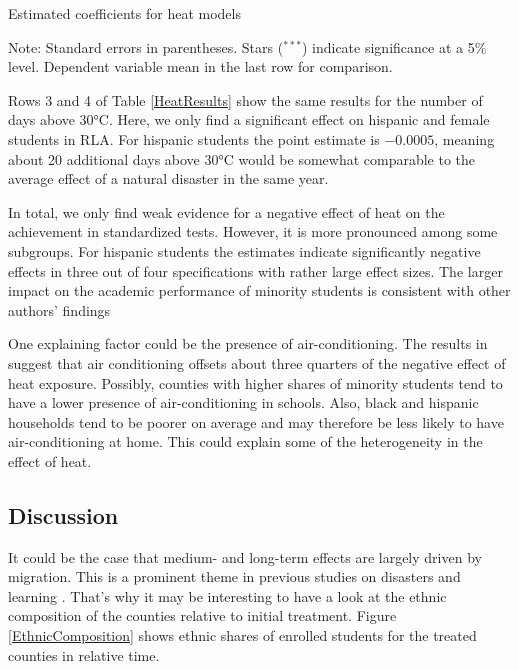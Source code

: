 \begin{table}
	\small
	\caption{Estimated coefficients for heat models}
	\label{HeatResults}
	
	{\raggedright Note: Standard errors in parentheses. Stars ($^{***}$) indicate significance at a 5\% level. Dependent variable mean in the last row for comparison. \par}
\end{table}

Rows 3 and 4 of Table \ref{HeatResults} show the same results for the number of days above 30°C. Here, we only find a significant effect on hispanic and female students in RLA. For hispanic students the point estimate is $-0.0005$, meaning about 20 additional days above 30°C would be somewhat comparable to the average effect of a natural disaster in the same year.

In total, we only find weak evidence for a negative effect of heat on the achievement in standardized tests. However, it is more pronounced among some subgroups. For hispanic students the estimates indicate significantly negative effects in three out of four specifications with rather large effect sizes. The larger impact on the academic performance of minority students is consistent with other authors' findings \citep[for example][]{Goodman_2020}

One explaining factor could be the presence of air-conditioning. The results in \cite{Goodman_2020} suggest that air conditioning offsets about three quarters of the negative effect of heat exposure. Possibly, counties with higher shares of minority students tend to have a lower presence of air-conditioning in schools. Also, black and hispanic households tend to be poorer on average and may therefore be less likely to have air-conditioning at home. This could explain some of the heterogeneity in the effect of heat.


\subsection{Discussion}

It could be the case that medium- and long-term effects are largely driven by migration. This is a prominent theme in previous studies on disasters and learning \citep{Pane_2008, Sacerdote_2012}. That's why it may be interesting to have a look at the ethnic composition of the counties relative to initial treatment. Figure \ref{EthnicComposition} shows ethnic shares of enrolled students for the treated counties in relative time.

